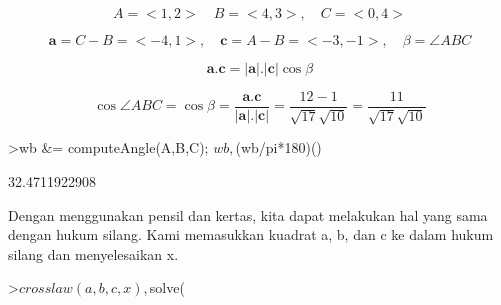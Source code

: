 \documentclass[a4paper,10pt]{article}
\begin{document}
\begin{eulernotebook}
\begin{eulercomment}
\begin{eulercomment}
\begin{eulercomment}
\begin{eulercomment}
\begin{eulercomment}
\begin{eulercomment}
\begin{eulercomment}
\begin{eulercomment}
\begin{eulercomment}
\begin{eulercomment}
\begin{eulercomment}
\begin{eulercomment}
\begin{eulercomment}
\begin{eulercomment}
\begin{eulercomment}
\begin{eulercomment}
\begin{eulercomment}
\begin{eulercomment}
\begin{eulercomment}
\begin{eulercomment}
\begin{eulercomment}
\begin{eulercomment}
\begin{eulercomment}
\begin{eulercomment}
\begin{eulercomment}
\begin{eulercomment}
\begin{eulercomment}
\begin{eulercomment}
\begin{eulercomment}
\begin{eulercomment}
\begin{eulercomment}
\begin{eulercomment}
\begin{eulercomment}
\begin{eulercomment}
\begin{eulercomment}
\begin{eulercomment}
\begin{eulercomment}
\begin{eulercomment}
\begin{eulercomment}
\begin{eulercomment}
\begin{eulercomment}
\end{eulercomment}
\begin{eulerformula}
\[
A=<1,2>\quad B=<4,3>,\quad C=<0,4>
\]
\end{eulerformula}
\begin{eulerformula}
\[
\mathbf{a}=C-B=<-4,1>,\quad \mathbf{c}=A-B=<-3,-1>,\quad \beta=\angle ABC
\]
\end{eulerformula}
\begin{eulerformula}
\[
\mathbf{a}.\mathbf{c}=|\mathbf{a}|.|\mathbf{c}|\cos \beta
\]
\end{eulerformula}
\begin{eulerformula}
\[
\cos \angle ABC =\cos\beta=\frac{\mathbf{a}.\mathbf{c}}{|\mathbf{a}|.|\mathbf{c}|}=\frac{12-1}{\sqrt{17}\sqrt{10}}=\frac{11}{\sqrt{17}\sqrt{10}}
\]
\end{eulerformula}
\begin{eulerprompt}
>wb &= computeAngle(A,B,C); $wb, $(wb/pi*180)()
\end{eulerprompt}
\begin{euleroutput}
  32.4711922908
\end{euleroutput}
\begin{eulercomment}
Dengan menggunakan pensil dan kertas, kita dapat melakukan hal yang
sama dengan hukum silang. Kami memasukkan kuadrat a, b, dan c ke dalam
hukum silang dan menyelesaikan x.
\end{eulercomment}
\begin{eulerprompt}
>$crosslaw(a,b,c,x), $solve(%
\end{eulerprompt}
\begin{eulercomment}

\end{eulercomment}
\end{eulercomment}
\end{eulercomment}
\end{eulercomment}
\end{eulercomment}
\end{eulercomment}
\end{eulercomment}
\end{eulercomment}
\end{eulercomment}
\end{eulercomment}
\end{eulercomment}
\end{eulercomment}
\end{eulercomment}
\end{eulercomment}
\end{eulercomment}
\end{eulercomment}
\end{eulercomment}
\end{eulercomment}
\end{eulercomment}
\end{eulercomment}
\end{eulercomment}
\end{eulercomment}
\end{eulercomment}
\end{eulercomment}
\end{eulercomment}
\end{eulercomment}
\end{eulercomment}
\end{eulercomment}
\end{eulercomment}
\end{eulercomment}
\end{eulercomment}
\end{eulercomment}
\end{eulercomment}
\end{eulercomment}
\end{eulercomment}
\end{eulercomment}
\end{eulercomment}
\end{eulercomment}
\end{eulercomment}
\end{eulercomment}
\end{eulercomment}
\end{eulernotebook}
\end{document}
